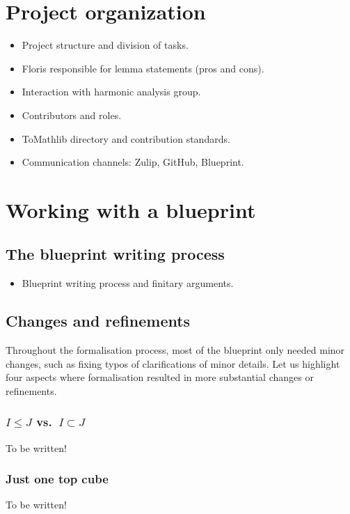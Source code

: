 \documentclass[12pt]{amsart}
\begin{document}
\section{Project organization}\label{sec:org}
\begin{itemize}
  \item Project structure and division of tasks.
  \item Floris responsible for lemma statements (pros and cons).
  \item Interaction with harmonic analysis group.
  \item Contributors and roles.
  \item ToMathlib directory and contribution standards.
  \item Communication channels: Zulip, GitHub, Blueprint.
\end{itemize}

\section{Working with a blueprint}\label{sec:blueprint}
\subsection{The blueprint writing process}\label{subsec:blueprint_writing}
\begin{itemize}
	\item Blueprint writing process and finitary arguments.
\end{itemize}

\subsection{Changes and refinements}\label{subsec:blueprint_changes}

Throughout the formalisation process, most of the blueprint only needed minor changes, such as fixing typos of clarifications of minor details. Let us highlight four aspects where formalisation resulted in more substantial changes or refinements.

\subsubsection{$I \leq J$ vs.\ $I \subset J$}
To be written!

\subsubsection{Just one top cube} To be written!
\end{document}
